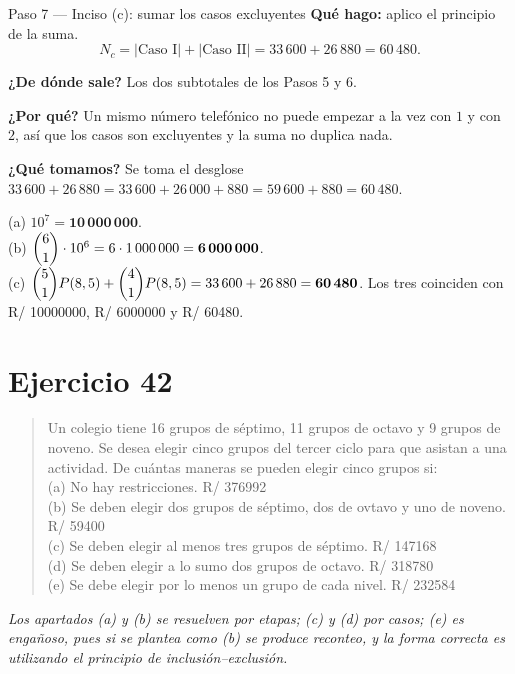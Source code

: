 \documentclass[11pt]{article}
\begin{document}
\begin{paso}{Paso 7 --- Inciso (c): sumar los casos excluyentes}
\textbf{Qué hago:} aplico el principio de la suma.
\[
  N_c = |\text{Caso I}|+|\text{Caso II}| = 33\,600 + 26\,880 = 60\,480 .
\]

\textbf{¿De dónde sale?} Los dos subtotales de los Pasos 5 y 6.

\textbf{¿Por qué?} Un mismo número telefónico no puede empezar a la vez con $1$ y con $2$, así que los casos son excluyentes y la suma no duplica nada.

\textbf{¿Qué tomamos?} Se toma el desglose $33\,600+26\,880 = 33\,600+26\,000+880 = 59\,600+880 = 60\,480$.
\end{paso}

\begin{resp}
(a) $10^7=\mathbf{10\,000\,000}$.\\[2pt]
(b) $\dbinom{6}{1}\cdot 10^6=6\cdot 1\,000\,000=\mathbf{6\,000\,000}$.\\[2pt]
(c) $\dbinom{5}{1}P(8,5) + \dbinom{4}{1}P(8,5) = 33\,600+26\,880 = \mathbf{60\,480}$. Los tres coinciden con R/ 10000000, R/ 6000000 y R/ 60480.
\end{resp}

\section*{Ejercicio 42}

\begin{quote}
Un colegio tiene 16 grupos de séptimo, 11 grupos de octavo y 9 grupos de noveno. Se desea elegir cinco grupos del tercer ciclo para que asistan a una actividad. De cuántas maneras se pueden elegir cinco grupos si:\\[2pt]
(a) No hay restricciones. \hfill R/ 376992\\
(b) Se deben elegir dos grupos de séptimo, dos de ovtavo y uno de noveno. \hfill R/ 59400\\
(c) Se deben elegir al menos tres grupos de séptimo. \hfill R/ 147168\\
(d) Se deben elegir a lo sumo dos grupos de octavo. \hfill R/ 318780\\
(e) Se debe elegir por lo menos un grupo de cada nivel. \hfill R/ 232584
\end{quote}

\emph{Los apartados (a) y (b) se resuelven por etapas; (c) y (d) por casos; (e) es engañoso, pues si se plantea como (b) se produce reconteo, y la forma correcta es utilizando el principio de inclusión--exclusión.}
\end{document}
